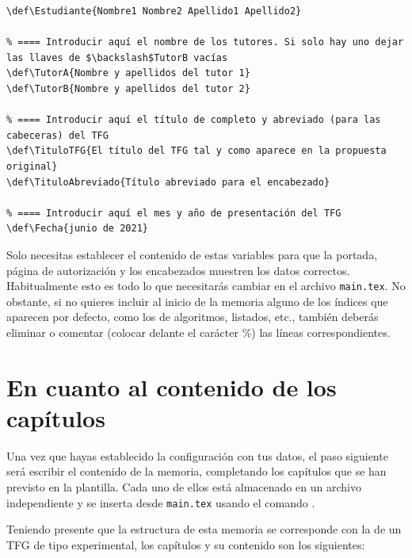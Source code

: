 \begin{lstlisting}[caption={Variables a establecer en \texttt{main.tex}},language={[LaTeX]TeX},label=List.Variables]
% ==== Introducir aquí el nombre del estudiante
\def\Estudiante{Nombre1 Nombre2 Apellido1 Apellido2}

% ==== Introducir aquí el nombre de los tutores. Si solo hay uno dejar las llaves de $\backslash$TutorB vacías
\def\TutorA{Nombre y apellidos del tutor 1}
\def\TutorB{Nombre y apellidos del tutor 2}

% ==== Introducir aquí el título de completo y abreviado (para las cabeceras) del TFG
\def\TituloTFG{El título del TFG tal y como aparece en la propuesta original}
\def\TituloAbreviado{Título abreviado para el encabezado}

% ==== Introducir aquí el mes y año de presentación del TFG
\def\Fecha{junio de 2021}
\end{lstlisting}

Solo necesitas establecer el contenido de estas variables para que la portada, página de autorización y los encabezados muestren los datos correctos. Habitualmente esto es todo lo que necesitarás cambiar en el archivo \texttt{main.tex}. No obstante, si no quieres incluir al inicio de la memoria alguno de los índices que aparecen por defecto, como los de algoritmos, listados, etc., también deberás eliminar o comentar (colocar delante el carácter \%) las líneas correspondientes.

\section{En cuanto al contenido de los capítulos}

Una vez que hayas establecido la configuración con tus datos, el paso siguiente será escribir el contenido de la memoria, completando los capítulos que se han previsto en la plantilla. Cada uno de ellos está almacenado en un archivo independiente y se inserta desde \texttt{main.tex} usando el comando \verb||. 

Teniendo presente que la estructura de esta memoria se corresponde con la de un TFG de tipo experimental, los capítulos y su contenido son los siguientes:


